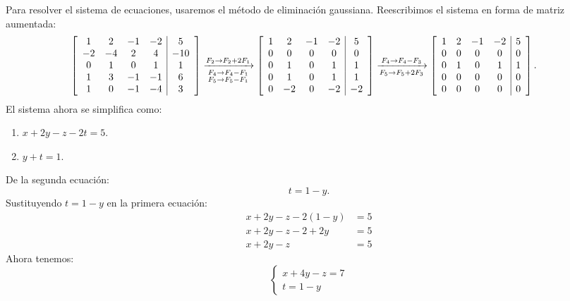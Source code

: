 \begin{enumerate}[label=\color{red}\textbf{\arabic*)}]
Para resolver el sistema de ecuaciones, usaremos el método de eliminación gaussiana. Reescribimos el sistema en forma de matriz aumentada: \[
    \begin{aligned}
\left[ \begin{array}{cccc|c}
        1 & 2 & -1 & -2 & 5\\
        -2 & -4 & 2 & 4 & -10\\
        0 & 1 & 0 & 1 & 1 \\
        1 & 3 & -1 & -1 & 6\\
        1 & 0 & -1 & -4 & 3
\end{array} \right] & \xrightarrow[\begin{subarray}{l}
    F_4\to F_4-F_1\\
    F_5\to F_5-F_1
\end{subarray}]{F_2\to F_2+2F_1} \left[\begin{array}{cccc|c} 
1 & 2 & -1 & -2 & 5\\
0 & 0 & 0 & 0 & 0\\
0 & 1 & 0 & 1 & 1\\
0 & 1 & 0 & 1 & 1\\
0 & -2 & 0 & -2 & -2
\end{array}\right] \xrightarrow[F_5\to F_5+2F_3]{F_4\to F_4-F_3}\left[ \begin{array}{cccc|c}
1 & 2 & -1 & -2 & 5\\
0 & 0 & 0 & 0 & 0\\
0 & 1 & 0 & 1 & 1\\
0 & 0 & 0 & 0 & 0\\
0 & 0 & 0 & 0 & 0\\
\end{array} \right] .
    \end{aligned}
\] 
El sistema ahora se simplifica como:
\begin{enumerate}[label=\arabic*)]
    \item $x+2y-z-2t=5$.
    \item $y+t=1$.
\end{enumerate}
De la segunda ecuación: \[
t=1-y.
\] 
Sustituyendo $t=1-y$ en la primera ecuación:  \[
\begin{aligned}
    x+2y-z-2(1-y)&= 5 \\
    x+2y-z-2+2y&= 5 \\
    x+2y-z&=5
\end{aligned}
\] 
Ahora tenemos: \[
\begin{cases}
    x+4y-z=7\\
    t=1-y
\end{cases}
\]
\end{enumerate}
